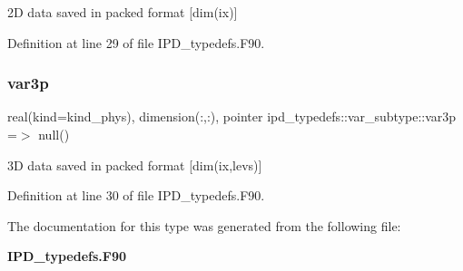 2D data saved in packed format [dim(ix)] 



Definition at line 29 of file I\+P\+D\+\_\+typedefs.\+F90.

\mbox{\label{structipd__typedefs_1_1var__subtype_a684be28ad797b106280139ee10f7ff48}} 
\subsubsection{var3p}
{\footnotesize\ttfamily real(kind=kind\+\_\+phys), dimension(\+:,\+:), pointer ipd\+\_\+typedefs\+::var\+\_\+subtype\+::var3p =$>$ null()}



3D data saved in packed format [dim(ix,levs)] 



Definition at line 30 of file I\+P\+D\+\_\+typedefs.\+F90.



The documentation for this type was generated from the following file\+:\begin{DoxyCompactItemize}
\item 
\textbf{ I\+P\+D\+\_\+typedefs.\+F90}\end{DoxyCompactItemize}
